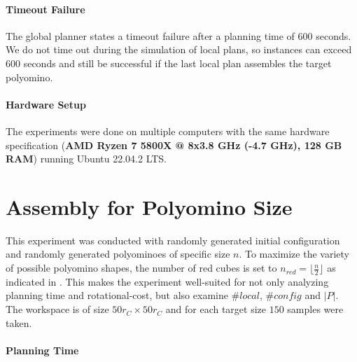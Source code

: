 \paragraph{Timeout Failure}
The global planner states a timeout failure after a planning time of $600$ seconds.
We do not time out during the simulation of local plans, so instances can exceed $600$ seconds and still be successful if the last local plan assembles the target polyomino.

\paragraph{Hardware Setup}
The experiments were done on multiple computers with the same hardware specification (\textbf{AMD Ryzen 7 5800X @ 8x3.8 GHz (-4.7 GHz), 128 GB RAM}) running Ubuntu 22.04.2 LTS.



\section{Assembly for Polyomino Size}
\label{sec:AFN}

This experiment was conducted with randomly generated initial configuration and randomly generated polyominoes of specific size $n$.
To maximize the variety of possible polyomino shapes, the number of red cubes is set to $n_\textit{red} = \lfloor \frac{n}{2} \rfloor$ as indicated in \cite{Lu2021}.
This makes the experiment well-suited for not only analyzing planning time and rotational-cost, but also examine $\#\textit{local}$, $\#\textit{config}$ and $|P|$.
The workspace is of size $50 r_C \times 50 r_C$ and for each target size $150$ samples were taken.

\paragraph{Planning Time}

